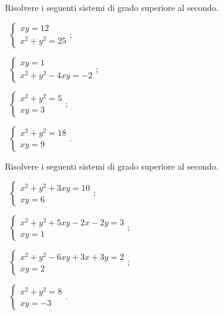 \begin{esercizio}[\Ast]
 \label{ese:6.42}
Risolvere i seguenti sistemi di grado superiore al secondo.
\begin{multicols}{2}
 \begin{enumeratea}
 \item~$\left\{\begin{array}{l}xy=12 \\x^2+y^2=25\end{array}\right.$;
 \item~$\left\{\begin{array}{l}xy=1 \\x^2+y^2-4xy=-2\end{array}\right.$;
 \item~$\left\{\begin{array}{l}x^2+y^2=5\\xy=3 \end{array}\right.$;
 \item~$\left\{\begin{array}{l}x^2+y^2=18\\xy=9 \end{array}\right.$.
 \end{enumeratea}
 \end{multicols}
\end{esercizio}

\begin{esercizio}[\Ast]
 \label{ese:6.43}
Risolvere i seguenti sistemi di grado superiore al secondo.
\begin{multicols}{2}
 \begin{enumeratea}
 \item~$\left\{\begin{array}{l}x^2+y^2+3xy=10\\xy=6 \end{array}\right.$;
 \item~$\left\{\begin{array}{l}x^2+y^2+5xy-2x-2y=3\\xy=1 \end{array}\right.$;
 \item~$\left\{\begin{array}{l}x^2+y^2-6xy+3x+3y=2\\xy=2 \end{array}\right.$;
 \item~$\left\{\begin{array}{l}x^2+y^2=8\\xy=-3\end{array}\right.$.
 \end{enumeratea}
 \end{multicols}
\end{esercizio}

